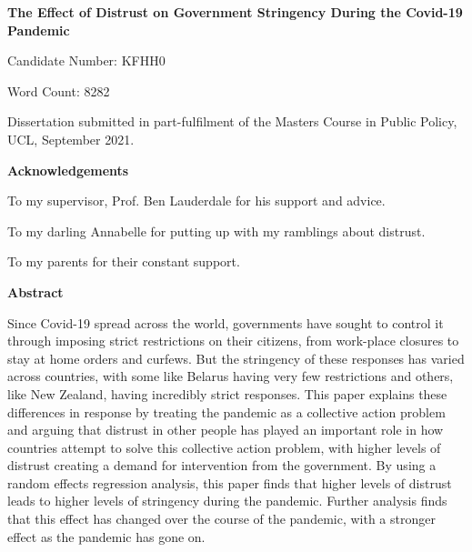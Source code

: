 \documentclass[
  12pt,
]{article}
\author{}
\date{\vspace{-2.5em}}
\begin{document}
\begin{titlepage}
\begin{center}
\vspace*{5cm}
\LARGE
\textbf{The Effect of Distrust on Government Stringency During the Covid-19 Pandemic}


\vspace{1.5cm}
\large
Candidate Number: KFHH0

\vspace{0.5cm}
Word Count: 8282

\vfill

Dissertation submitted in part-fulfilment of the Masters Course in Public Policy, UCL,  September 2021.

\end{center}
\end{titlepage}

\begin{center}
\textbf{Acknowledgements}

To my supervisor, Prof. Ben Lauderdale for his support and advice.

To my darling Annabelle for putting up with my ramblings about distrust.

To my parents for their constant support.
\end{center}

\pagebreak

\begin{center}
\vspace*{5cm}
\textbf{Abstract}
\end{center}
Since Covid-19 spread across the world, governments have sought to control it through imposing strict restrictions on their citizens, from work-place closures to stay at home orders and curfews. But the stringency of these responses has varied across countries, with some like Belarus having very few restrictions and others, like New Zealand, having incredibly strict responses. This paper explains these differences in response by treating the pandemic as a collective action problem and arguing that distrust in other people has played an important role in how countries attempt to solve this collective action problem, with higher levels of distrust creating a demand for intervention from the government. By using a random effects regression analysis, this paper finds that higher levels of distrust leads to higher levels of stringency during the pandemic. Further analysis finds that this effect has changed over the course of the pandemic, with a stronger effect as the pandemic has gone on.
\pagebreak
\end{document}
